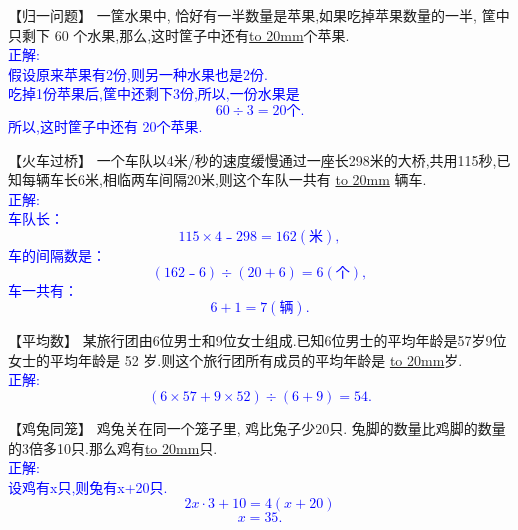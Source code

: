
\item {
    【归一问题】
    一筐水果中, 恰好有一半数量是苹果,如果吃掉苹果数量的一半, 筐中只剩下 60 个水果,那么,这时筐子中还有\underline{\hbox to 20mm{}}个苹果.
    \ifshowSolution{}
        \fangsong{}\textcolor{blue}{
            \\正解:\\
            假设原来苹果有2份,则另一种水果也是2份.\\
            吃掉1份苹果后,筐中还剩下3份,所以,一份水果是
            \[
                60\div 3 = 20个.
            \]
            所以,这时筐子中还有 20个苹果.
        }
    \else
        \vspace{2cm}
    \fi
}

\item {
    【火车过桥】
    一个车队以4米/秒的速度缓慢通过一座长298米的大桥,共用115秒,已知每辆车长6米,相临两车间隔20米,则这个车队一共有 \underline{\hbox to 20mm{}} 辆车.
    \ifshowSolution{}
        \fangsong{}\textcolor{blue}{
            \\正解:\\
            车队长：\[115\times 4﹣298=162 (米), \]
            车的间隔数是：\[(162﹣6)\div (20+6)=6(个),\]
            车一共有：\[ 6+1 = 7(辆).\]
        }
    \else
        \vspace{2cm}
    \fi
}

\item {
    【平均数】
    某旅行团由6位男士和9位女士组成.已知6位男士的平均年龄是57岁9位女士的平均年龄是 52 岁.则这个旅行团所有成员的平均年龄是 \underline{\hbox to 20mm{}}岁.
    \ifshowSolution{}
        \fangsong{}\textcolor{blue}{
            \\正解:\\
            \[(6\times 57 + 9\times 52)\div (6+9)=54.\]
        }
    \else
        \vspace{2cm}
    \fi
}

\item {
    【鸡兔同笼】
    鸡兔关在同一个笼子里, 鸡比兔子少20只. 兔脚的数量比鸡脚的数量的3倍多10只.那么鸡有\underline{\hbox to 20mm{}}只. 
    \ifshowSolution{}
        \fangsong{}\textcolor{blue}{
            \\正解:\\
            设鸡有x只,则兔有x+20只.
            \[2x\cdot 3 + 10 = 4(x+20)\]
            \[x = 35.\]
        }
    \else
        \vspace{2cm}
    \fi
}

